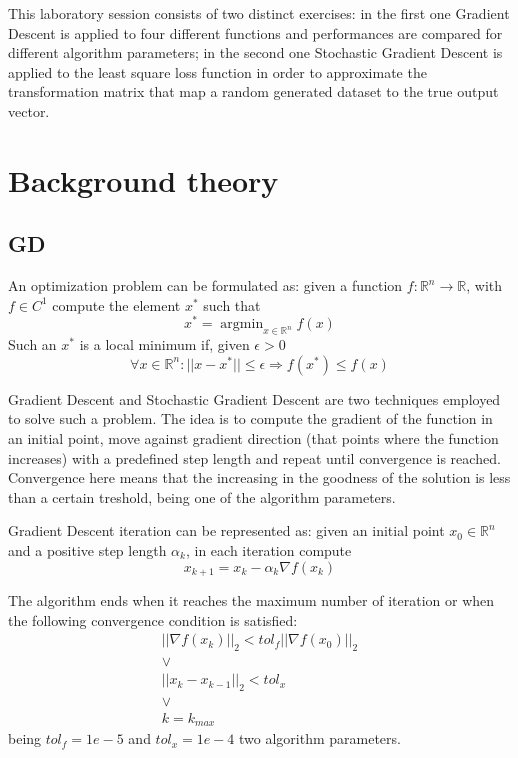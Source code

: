 \documentclass[a4paper,10pt]{report}
\newcommand{\argmin}{\mathop{\mathrm{argmin}}}
\begin{document}
This laboratory session consists of two distinct exercises: in the first one Gradient Descent is applied to four different functions and performances are compared for different algorithm parameters;
in the second one Stochastic Gradient Descent is applied to the least square loss function in order to approximate the transformation matrix that map a random generated dataset to the true output vector.

\chapter{Background theory}\label{chap:background}
\section{GD}
An optimization problem can be formulated as: given a function $f:\mathbb{R}^n\rightarrow \mathbb{R}$, with $f\in C^1$ compute the element $x^*$ such that
\begin{equation}
  x^*=\argmin_{x\in \mathbb{R}^n} f(x)
\end{equation}
Such an $x^*$ is a local minimum if, given $\epsilon>0$
\begin{equation}
  \forall x\in \mathbb{R}^n: ||x-x^*||\leq\epsilon \Rightarrow f(x^*)\leq f(x)
\end{equation}

Gradient Descent and Stochastic Gradient Descent are two techniques employed to solve such a problem.
The idea is to compute the gradient of the function in an initial point, move against gradient direction (that points where the function increases) with a predefined step length and repeat until convergence is reached.
Convergence here means that the increasing in the goodness of the solution is less than a certain treshold, being one of the algorithm parameters.

Gradient Descent iteration can be represented as: given an initial point $x_0 \in \mathbb{R}^n$ and a positive step length $\alpha_k$, in each iteration compute
\begin{equation}
  x_{k+1}=x_k - \alpha_k\nabla f(x_k)
\end{equation}

The algorithm ends when it reaches the maximum number of iteration or when the following convergence condition is satisfied:
\begin{equation}
  \begin{gathered}
  ||\nabla f(x_k)||_2 < tol_f||\nabla f(x_0)||_2 \\ \vee \\ ||x_k-x_{k-1}||_2 < tol_x \\ \vee \\ k=k_{max}
\end{gathered}
\label{eq:convergence}
\end{equation}
being $tol_f=1e-5$ and $tol_x=1e-4$ two algorithm parameters.
\end{document}
